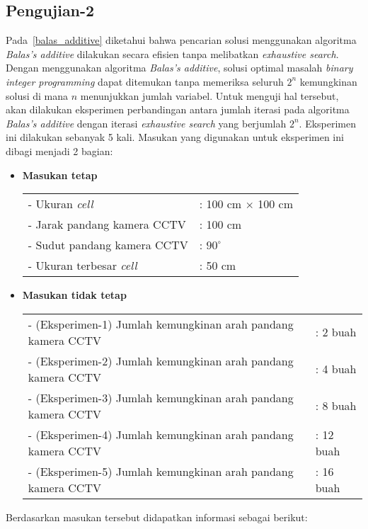 \subsection{Pengujian-2}
Pada~\ref{balas_additive} diketahui bahwa pencarian solusi menggunakan algoritma \textit{Balas's additive} dilakukan secara efisien tanpa melibatkan \textit{exhaustive search}. Dengan menggunakan algoritma \textit{Balas's additive}, solusi optimal masalah \textit{binary integer programming} dapat ditemukan tanpa memeriksa seluruh \(2^n\) kemungkinan solusi di mana \(n\) menunjukkan jumlah variabel. Untuk menguji hal tersebut, akan dilakukan eksperimen perbandingan antara jumlah iterasi pada algoritma \textit{Balas's additive} dengan iterasi \textit{exhaustive search} yang berjumlah \(2^n\). Eksperimen ini dilakukan sebanyak 5 kali. Masukan yang digunakan untuk eksperimen ini dibagi menjadi 2 bagian:
\begin{itemize}
	\item \textbf{Masukan tetap}\\
	\begin{tabular}{ll}
		- Ukuran \textit{cell} &: 100 cm $\times$ 100 cm\\
		- Jarak pandang kamera CCTV &: 100 cm\\
		- Sudut pandang kamera CCTV &: $90^\circ$\\
		- Ukuran terbesar \textit{cell} &: 50 cm\\
	\end{tabular}
	
	\item \textbf{Masukan tidak tetap}\\
	\begin{tabular}{ll}
		- (Eksperimen-1) Jumlah kemungkinan arah pandang kamera CCTV &: 2 buah\\
		- (Eksperimen-2) Jumlah kemungkinan arah pandang kamera CCTV &: 4 buah\\
		- (Eksperimen-3) Jumlah kemungkinan arah pandang kamera CCTV &: 8 buah\\
		- (Eksperimen-4) Jumlah kemungkinan arah pandang kamera CCTV &: 12 buah\\
		- (Eksperimen-5) Jumlah kemungkinan arah pandang kamera CCTV &: 16 buah\\
	\end{tabular}
\end{itemize}
Berdasarkan masukan tersebut didapatkan informasi sebagai berikut:

